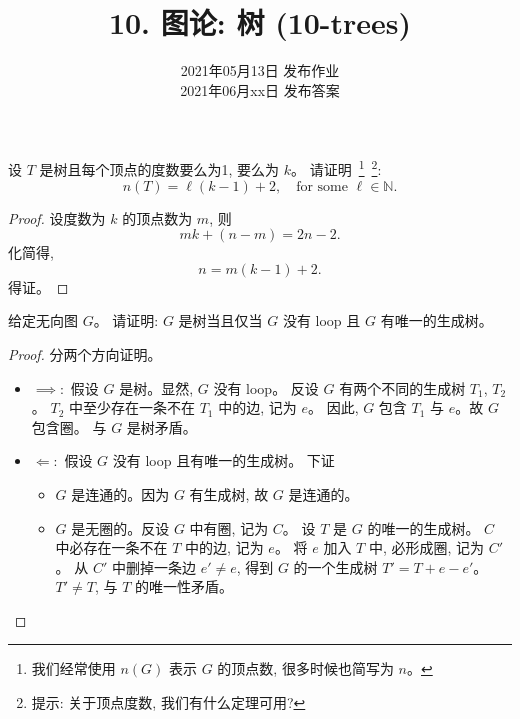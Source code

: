 \documentclass[a4paper, justified]{tufte-handout}
\title{10. 图论: 树 (10-trees)}
\date{2021年05月13日 发布作业 \\ 2021年06月xx日 发布答案}
\begin{document}
\maketitle
\noplagiarism %
\begin{abstract}
\end{abstract}
\beginrequired

\begin{problem}
  设 $T$ 是树且每个顶点的度数要么为1, 要么为 $k$。
  请证明~\footnote{我们经常使用 $n(G)$ 表示 $G$ 的顶点数,
    很多时候也简写为 $n$。}~\footnote{提示:
  关于顶点度数, 我们有什么定理可用?}:
  \[
    n(T) = \ell (k-1) + 2, \quad \text{for some } \ell \in \mathbb{N}.
  \]
\end{problem}

\begin{proof}
  设度数为 $k$ 的顶点数为 $m$, 则
  \[
    mk + (n-m) = 2n - 2.
  \]
  化简得,
  \[
    n = m(k - 1) + 2.
  \]
  得证。
\end{proof}

\begin{problem}
  给定无向图 $G$。
  请证明: $G$ 是树当且仅当 $G$ 没有 loop 且 $G$ 有唯一的生成树。
\end{problem}

\begin{proof}
  分两个方向证明。
  \begin{itemize}
    \item $\implies:$ 假设 $G$ 是树。显然, $G$ 没有 loop。
      反设 $G$ 有两个不同的生成树 $T_{1}$, $T_{2}$。
      $T_{2}$ 中至少存在一条不在 $T_{1}$ 中的边, 记为 $e$。
      因此, $G$ 包含 $T_{1}$ 与 $e$。故 $G$ 包含圈。
      与 $G$ 是树矛盾。
    \item $\Longleftarrow:$ 假设 $G$ 没有 loop 且有唯一的生成树。
      下证
      \begin{itemize}
        \item $G$ 是连通的。因为 $G$ 有生成树, 故 $G$ 是连通的。
        \item $G$ 是无圈的。反设 $G$ 中有圈, 记为 $C$。
          设 $T$ 是 $G$ 的唯一的生成树。
          $C$ 中必存在一条不在 $T$ 中的边, 记为 $e$。
          将 $e$ 加入 $T$ 中, 必形成圈, 记为 $C'$。
          从 $C'$ 中删掉一条边 $e' \neq e$,
          得到 $G$ 的一个生成树 $T' = T + e - e'$。
          $T' \neq T$, 与 $T$ 的唯一性矛盾。
      \end{itemize}
  \end{itemize}
\end{proof}
\end{document}
